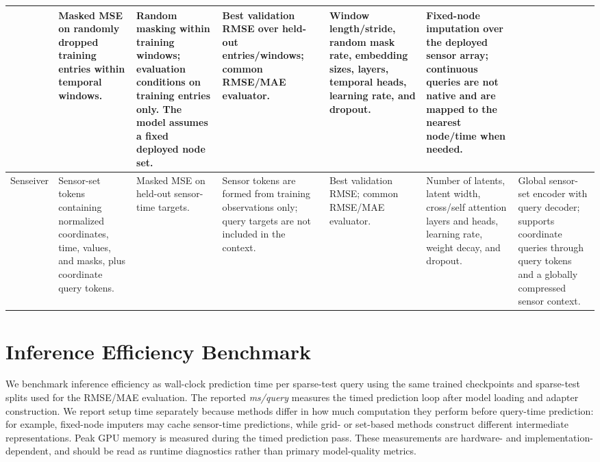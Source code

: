 \begin{table}[htbp]
{\begin{tabular}{p{}p{}p{}p{}p{}p{}p{}}
& Masked MSE on randomly dropped training entries within temporal windows.
& Random masking within training windows; evaluation conditions on training entries only. The model assumes a fixed deployed node set.
& Best validation RMSE over held-out entries/windows; common RMSE/MAE evaluator.
& Window length/stride, random mask rate, embedding sizes, layers, temporal heads, learning rate, and dropout.
& Fixed-node imputation over the deployed sensor array; continuous queries are not native and are mapped to the nearest node/time when needed. \\
\midrule
Senseiver
& Sensor-set tokens containing normalized coordinates, time, values, and masks, plus coordinate query tokens.
& Masked MSE on held-out sensor-time targets.
& Sensor tokens are formed from training observations only; query targets are not included in the context.
& Best validation RMSE; common RMSE/MAE evaluator.
& Number of latents, latent width, cross/self attention layers and heads, learning rate, weight decay, and dropout.
& Global sensor-set encoder with query decoder; supports coordinate queries through query tokens and a globally compressed sensor context. \\
\bottomrule
\end{tabular}%
}
\end{table}

\section{Inference Efficiency Benchmark}
\label{sec:inference_efficiency}

We benchmark inference efficiency as wall-clock prediction time per sparse-test query using the same trained checkpoints and sparse-test splits used for the RMSE/MAE evaluation. The reported \emph{ms/query} measures the timed prediction loop after model loading and adapter construction. We report setup time separately because methods differ in how much computation they perform before query-time prediction: for example, fixed-node imputers may cache sensor-time predictions, while grid- or set-based methods construct different intermediate representations. Peak GPU memory is measured during the timed prediction pass. These measurements are hardware- and implementation-dependent, and should be read as runtime diagnostics rather than primary model-quality metrics.

